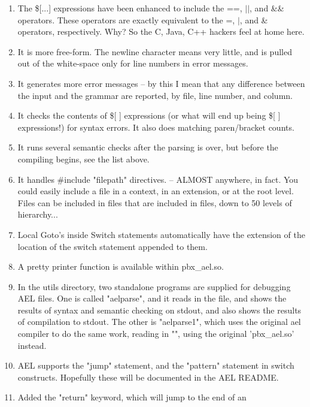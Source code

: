 {\begin{enumerate}
   \item The \$[...] expressions have been enhanced to include the ==, $|$$|$,
      and \&\& operators. These operators are exactly equivalent to the
      =, $|$, and \& operators, respectively. Why? So the C, Java, C++
      hackers feel at home here.
   \item It is more free-form. The newline character means very little,
      and is pulled out of the white-space only for line numbers in
      error messages.
   \item It generates more error messages -- by this I mean that any
      difference between the input and the grammar are reported, by
      file, line number, and column.
   \item It checks the contents of \$[ ] expressions (or what will end up
      being \$[ ] expressions!) for syntax errors. It also does
      matching paren/bracket counts.
   \item It runs several semantic checks after the parsing is over, but
      before the compiling begins, see the list above.
   \item It handles \#include "filepath" directives. -- ALMOST
      anywhere, in fact. You could easily include a file in a context,
      in an extension, or at the root level. Files can be included in
      files that are included in files, down to 50 levels of hierarchy...
   \item Local Goto's inside Switch statements automatically have the
      extension of the location of the switch statement appended to them.
   \item A pretty printer function is available within pbx\_ael.so.
   \item In the utils directory, two standalone programs are supplied for
      debugging AEL files. One is called "aelparse", and it reads in
      the  file, and shows the results of
      syntax and semantic checking on stdout, and also shows the
      results of compilation to stdout. The other is "aelparse1",
      which uses the original ael compiler to do the same work,
      reading in "", using the original
      'pbx\_ael.so' instead.
  \item AEL supports the "jump" statement, and the "pattern" statement
      in switch constructs. Hopefully these will be documented in the
      AEL README.
  \item Added the "return" keyword, which will jump to the end of an
$$
\end{enumerate}}
